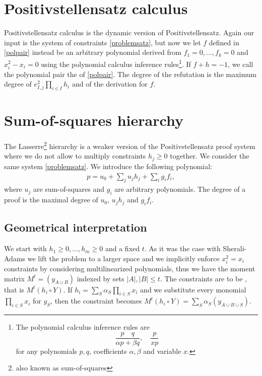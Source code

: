 \documentclass[a4paper,twoside,justified]{tufte-handout}
\begin{document}
\section{Positivstellensatz calculus\cite{grigoriev2001complexity}}
Positivstellensatz calculus is the dynamic version of Positivstellensatz. Again our input is the system of constraints \eqref{problemsatz}, but now we let $f$ defined in \eqref{polpair} instead be an arbitrary polynomial derived from $f_1=0,\ldots,f_k=0$ and $x_i^2-x_i=0$ using the polynomial calculus inference rules\footnote{
The polynomial calculus inference rules are
\begin{equation*}
\frac{p \quad q}{\alpha p + \beta q} , \quad \frac{p}{xp}
\end{equation*}
for any polynomials $p,q$, coefficients $\alpha,\beta$ and variable $x$.
}. If $f+h=-1$, we call the polynomial pair the  of \eqref{polpair}. The degree of the refutation is the maximum degree of $e^2_{I,j}\prod_{i\in I}h_i$ and of the derivation for $f$.

\section{Sum-of-squares hierarchy}
 The Lasserre\footnote{also known as sum-of-squares} hierarchy is a weaker version of the Positivstellensatz proof system where we do not allow to multiply constraints $h_j \geq 0$ together. We consider the same system \eqref{problemsatz}. We introduce the following polynomial:
\begin{eqnarray}
\label{polsos}
p=u_0+\sum_{j}u_jh_j+\sum_ig_if_i,
\end{eqnarray}
 where $u_j$ are sum-of-squares and $g_i$ are arbitrary polynomials. The degree of a proof is the maximal degree of $u_0$, $u_jh_j$ and $g_if_i$.

\subsection{Geometrical interpretation}

We start with $h_1\geq0,\ldots,h_m\geq0$ and a fixed $t$. As it was the case with Sherali-Adams we lift the problem to a larger space and we implicitly enforce $x_i^2=x_i$ constraints by considering multilinearized polynomials, thus we have the moment matrix $M^t=(y_{A \cup B})$ indexed by sets $|A|,|B| \leq t$. The constraints are to be , that is $M^t(h_i \circ Y)$. If $h_i = \sum_{S} \alpha_S \prod_{i\in S} x_i$ and we substitute every monomial $\prod_{i\in S}x_i$ for $y_S$, then the constraint becomes $M^t(h_i \circ Y) = \sum_S \alpha_S (y_{A \cup B \cup S})$.
\end{document}
